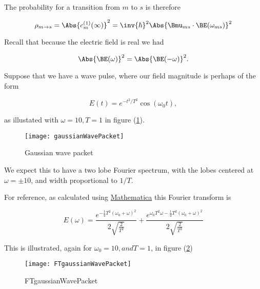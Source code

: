 The probability for a transition from $m$ to $s$ is therefore

\begin{equation}\label{eqn:qmTwoL8:70}
\rho_{m \rightarrow s} = \Abs{ c_m^{(1)}(\infty) }^2
= \inv{\hbar}^2 \Abs{\Bmu_{ms} \cdot \BE(\omega_{ms})}^2
\end{equation}

Recall that because the electric field is real we had

\begin{equation}\label{eqn:qmTwoL8:90}
\Abs{\BE(\omega)}^2 = \Abs{\BE(-\omega)}^2.
\end{equation}

Suppose that we have a wave pulse, where our field magnitude is perhaps of the form

\begin{equation}\label{eqn:qmTwoL8:110}
E(t) = e^{-t^2/T^2} \cos(\omega_0 t),
\end{equation}

as illustated with $\omega = 10, T = 1$ in figure (\ref{fig:gaussianWavePacket}).

\begin{figure}[htp]
\centering
\texttt{[image: gaussianWavePacket]}
\caption{Gaussian wave packet}\label{fig:gaussianWavePacket}
\end{figure}

We expect this to have a two lobe Fourier spectrum, with the lobes centered at $\omega = \pm 10$, and width proportional to $1/T$.

For reference, as calculated using \href{https://github.com/peeterjoot/physicsplay/tree/master/notes/phy456/qmTwoL8figures.nb}{Mathematica} this Fourier transform is

\begin{equation}\label{eqn:qmTwoL8:130}
E(\omega) = \frac{e^{-\frac{1}{4} T^2 (\omega_0+\omega )^2}}{2 \sqrt{\frac{2}{T^2}}}+\frac{e^{\omega_0 T^2 \omega -\frac{1}{4} T^2 (\omega_0+\omega )^2}}{2 \sqrt{\frac{2}{T^2}}}
\end{equation}

This is illustrated, again for $\omega_0 = 10, and T=1$, in figure (\ref{fig:FTgaussianWavePacket})

\begin{figure}[htp]
\centering
\texttt{[image: FTgaussianWavePacket]}
\caption{FTgaussianWavePacket}\label{fig:FTgaussianWavePacket}
\end{figure}

